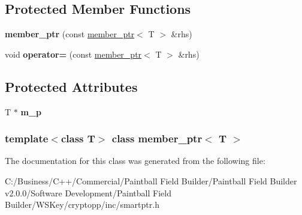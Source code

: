 \subsection*{Protected Member Functions}
\begin{DoxyCompactItemize}
\item 
\hypertarget{classmember__ptr_aec206e248e0e847ed7a9f4899a10dae8}{
{\bfseries member\_\-ptr} (const \hyperlink{classmember__ptr}{member\_\-ptr}$<$ T $>$ \&rhs)}
\label{classmember__ptr_aec206e248e0e847ed7a9f4899a10dae8}

\item 
\hypertarget{classmember__ptr_afbbdf66af19d975292fc1317fef9f664}{
void {\bfseries operator=} (const \hyperlink{classmember__ptr}{member\_\-ptr}$<$ T $>$ \&rhs)}
\label{classmember__ptr_afbbdf66af19d975292fc1317fef9f664}

\end{DoxyCompactItemize}
\subsection*{Protected Attributes}
\begin{DoxyCompactItemize}
\item 
\hypertarget{classmember__ptr_a82d41ef68f80d1add88d40ed274e2357}{
T $\ast$ {\bfseries m\_\-p}}
\label{classmember__ptr_a82d41ef68f80d1add88d40ed274e2357}

\end{DoxyCompactItemize}
\subsubsection*{template$<$class T$>$ class member\_\-ptr$<$ T $>$}



The documentation for this class was generated from the following file:\begin{DoxyCompactItemize}
\item 
C:/Business/C++/Commercial/Paintball Field Builder/Paintball Field Builder v2.0.0/Software Development/Paintball Field Builder/WSKey/cryptopp/inc/smartptr.h\end{DoxyCompactItemize}
